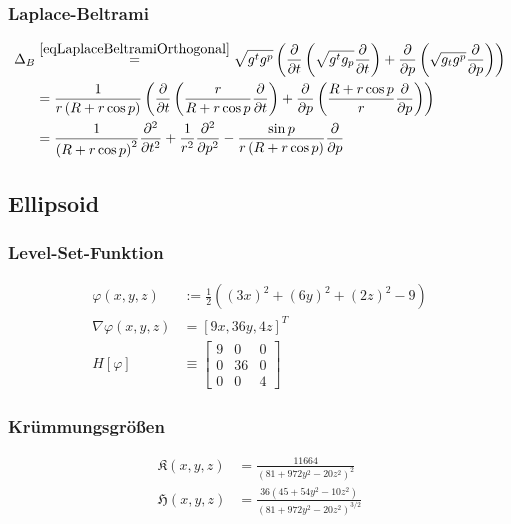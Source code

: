     \subsubsection{Laplace-Beltrami}
      \begin{align}
        \Delta_{B} &\overset{\eqref{eqLaplaceBeltramiOrthogonal}}{=} \sqrt{g^{t}g^{p}} 
                      \left(  \frac{\partial}{\partial t} 
                             \left( \sqrt{g^{t}g_{p}} \frac{\partial}{\partial t} \right) 
                                  + \frac{\partial}{\partial p} \left( \sqrt{g_{t}g^{p}} \frac{\partial}{\partial p} 
                       \right) \right) \\
                   &= \frac{1}{r\left( R + r\cos p \right)}
                      \left(  \frac{\partial}{\partial t} 
                             \left( \frac{r}{R + r\cos p} \frac{\partial}{\partial t} \right) 
                                  + \frac{\partial}{\partial p} \left( \frac{ R + r\cos p}{r} \frac{\partial}{\partial p} 
                       \right) \right) \\
                   &= \frac{1}{\left( R + r\cos p \right)^{2}} \frac{\partial^{2}}{\partial t^{2}}
                       + \frac{1}{r^{2}} \frac{\partial^{2}}{\partial p^{2}}
                       - \frac{\sin p}{r\left( R + r\cos p \right)} \frac{\partial}{\partial p}
      \end{align}

  \subsection{Ellipsoid}
    \label{heineC}
    
    \subsubsection{Level-Set-Funktion}
      \begin{align}
        \varphi(x,y,z) &:= \frac{1}{2}\left( (3x)^{2} + (6y)^{2} + (2z)^{2} - 9 \right) \\
        \nabla\varphi(x,y,z) &= \left[ 9x, 36y, 4z \right]^{T} \\
        H[\varphi] &\equiv \begin{bmatrix} 9 & 0 & 0 \\
                                             0 & 36 & 0 \\
                                             0 & 0 & 4 \end{bmatrix}
      \end{align}

     \subsubsection{Krümmungsgrößen}
      \begin{align}
        \mathfrak{K}(x,y,z) &= \frac{11664}{(81+972y^{2}-20z^{2})^{2}} \\
        \mathfrak{H}(x,y,z) &= \frac{36 \left(45+54 y^2-10 z^2\right)}{\left(81+972 y^2-20 z^2\right)^{3/2}}
      \end{align}

